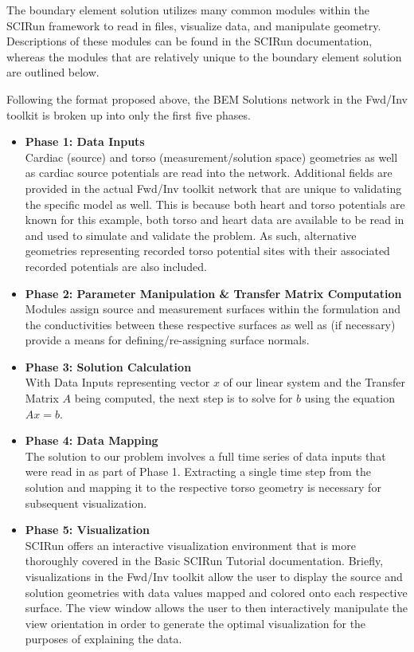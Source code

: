 The boundary element solution utilizes many common modules within the SCIRun framework
to read in files, visualize data, and manipulate geometry. Descriptions of these modules
can be found in the SCIRun documentation, whereas the modules that are relatively unique to the boundary element solution are outlined below.

Following the format proposed above, the BEM Solutions network in the Fwd/Inv toolkit is broken up into only the first five phases.
\begin{itemize}
\item {\bf Phase 1: Data Inputs} \\
Cardiac (source) and torso (measurement/solution space) geometries as well as cardiac source potentials are read into the network.  Additional fields are provided in the actual Fwd/Inv toolkit network that are unique to validating the specific model as well.  This is because both heart and torso potentials are known for this example, both torso and heart data are available to be read in and used to simulate and validate the problem.  As such, alternative geometries representing recorded torso potential sites with their associated recorded potentials are also included. 
\item {\bf Phase 2: Parameter Manipulation \& Transfer Matrix Computation} \\
Modules assign source and measurement surfaces within the formulation and the conductivities between these respective surfaces as well as (if necessary) provide a means for defining/re-assigning surface normals. 
\item {\bf Phase 3: Solution Calculation} \\ 
With Data Inputs representing vector $x$ of our linear system and the Transfer Matrix $A$ being computed, the next step is to solve for $b$ using the equation $Ax = b$.
\item {\bf Phase 4: Data Mapping} \\
The solution to our problem involves a full time series of data inputs that were read in as part of Phase 1. Extracting a single time step from the solution and mapping it to the respective torso geometry is necessary for subsequent visualization. 
\item {\bf Phase 5: Visualization} \\
SCIRun offers an interactive visualization environment that is more thoroughly covered in the Basic SCIRun Tutorial documentation. Briefly, visualizations in the Fwd/Inv toolkit allow the user to display the source and solution geometries with data values mapped and colored onto each respective surface.  The view window allows the user to then interactively manipulate the view orientation in order to generate the optimal visualization for the purposes of explaining the data.
\end{itemize}

